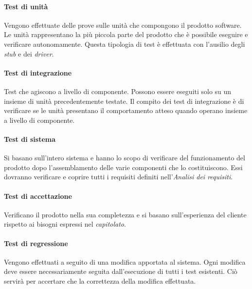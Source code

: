 \paragraph{Test di unità}
Vengono effettuate delle prove sulle unità che compongono il prodotto software. Le unità rappresentano la più piccola parte del prodotto che è possibile eseguire e verificare autonomamente. Questa tipologia di test è effettuata con l'ausilio degli \textit{stub\glo} e dei \textit{driver\glos}.

\paragraph{Test di integrazione}
Test che agiscono a livello di componente. Possono essere eseguiti solo su un insieme di unità precedentemente testate. Il compito dei test di integrazione è di verificare se le unità presentano il comportamento atteso quando operano insieme a livello di componente.

\paragraph{Test di sistema} 
Si basano sull'intero sistema e hanno lo scopo di verificare del funzionamento del prodotto dopo l'assemblamento delle varie componenti che lo costituiscono. Essi dovranno verificare e coprire tutti i requisiti definiti nell'\textit{Analisi dei requisiti\docs}.

\paragraph{Test di accettazione}
Verificano il prodotto nella sua completezza e si basano sull'esperienza del cliente rispetto ai bisogni espressi nel \textit{capitolato\glos}.

\paragraph{Test di regressione}
Vengono effettuati a seguito di una modifica apportata al sistema. Ogni modifica deve essere necessariamente seguita dall'esecuzione di tutti i test esistenti. Ciò servirà per accertare che la correttezza della modifica effettuata. 